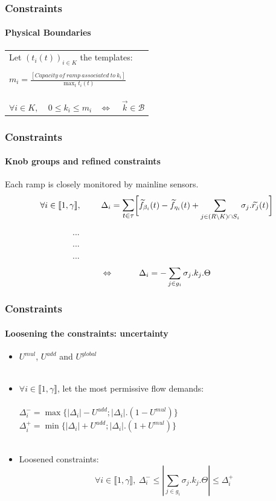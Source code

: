 \documentclass[fleqn]{beamer}
\begin{document}
\begin{frame}
	\frametitle{Constraints}
	\framesubtitle{Physical Boundaries}
	\begin{tabular}{l}
		Let $(t_{i}(t))_{i\in{K}}$ the templates:\\
		\\
		$m_{i}=\frac{[Capacity\ of\ ramp\ associated\ to\ k_{i}]}{\max_{t} t_{i}(t)}$\\
		\\
		\\
		\\
		$\forall i\in{K},\ \ \ \ \ 0\leq k_{i}\leq m_{i} \ \ \ \ \Leftrightarrow \ \ \ \ \ \vec{k}\in\mathscr{B}$
	\end{tabular}
\end{frame}


\begin{frame}
	\frametitle{Constraints}
	\framesubtitle{Knob groups and refined constraints}
		Each ramp is closely monitored by mainline sensors.\\
		\begin{equation*}
					\forall i \in \llbracket 1,\gamma \rrbracket, \ \ \ \ \ \ \ \Delta_{i} =\mathlarger{\sum\limits_{t\in \tau}}\bigg[\widetilde{f}_{\beta_{i}}(t)-\widetilde{f}_{\eta_{i}}(t)+\sum\limits_{j\in (R\backslash K)\cap S_{i}}\sigma_{j}.\widetilde{r_{j}}(t)\bigg]
		\end{equation*}
		~~~~~~~~~~~~~~~~...\\
		~~~~~~~~~~~~~~~~...\\
		~~~~~~~~~~~~~~~~...\\
		\begin{equation*}
			\centering
			\Leftrightarrow  \ \ \ \ \ \ \ \ \ \Delta_{i}=-\sum\limits_{j\in g_{i}}\sigma_{j}.k_{j}.\Theta
		\end{equation*}
\end{frame}


\begin{frame}
	\frametitle{Constraints}
	\framesubtitle{Loosening the constraints: uncertainty}
	\begin{itemize}
		\item $U^{mul}$, $U^{add}$ and $U^{global}$\\
		~\\
		\item $\forall i \in {\llbracket 1,\gamma \rrbracket}$, let the most permissive flow demands:\\
		~\\
		$\Delta_{i}^{-}=\max{\{|\Delta_{i}|-U^{add};|\Delta_{i}|.(1-U^{mul})\}}$\\
		$\Delta_{i}^{+}=\min{\{|\Delta_{i}|+U^{add};|\Delta_{i}|.(1+U^{mul})\}}$\\
		~\\
		\item Loosened constraints: 
			\begin{equation*}
			\forall i\in \llbracket 1,\gamma \rrbracket,\ \Delta_{i}^{-}\leq |\sum\limits_{j\in g_{i}}\sigma_{j}.k_{j}.\Theta| \leq \Delta_{i}^{+}
			\end{equation*}
	\end{itemize}

\end{frame}
\end{document}
